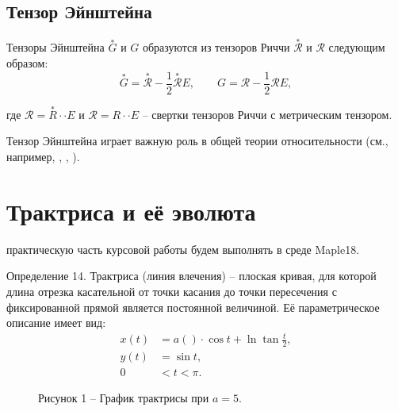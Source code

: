 \documentclass[14pt,a4paper]{extarticle}
\begin{document}
\subsection{Тензор Эйнштейна}
Тензоры Эйнштейна $\overset{*}{G}$ и $G$ образуются из тензоров Риччи $\overset{*}{\mathcal{R}}$ и $\mathcal{R}$ следующим образом:
\begin{equation}\label{eq39}
	\overset{*}{G} = \overset{*}{\mathcal{R}} - \frac{1}{2}\overset{*}{\mathcal{R}}E, \qquad G = \mathcal{R} - \frac{1}{2}\mathcal{R}E,
\end{equation}

где $\mathcal{R} = \overset{*}{R} \cdot \cdot E$ и $\mathcal{R} = R \cdot \cdot E$ -- свертки тензоров Риччи с метрическим тензором.

Тензор Эйнштейна играет важную роль в общей теории относительности (см., например, \cite{Petrov}, \cite{Rashevskiy}, \cite{Shipov}).



\newpage
\section{Трактриса и её эволюта}
практическую часть курсовой работы будем выполнять в среде Maple18.


Определение 14. Трактриса (линия влечения) -- плоская кривая, для которой длина отрезка касательной от точки касания до точки пересечения с фиксированной прямой является постоянной величиной. Её параметрическое описание имеет вид:
\begin{align}
	x(t) &= a ()\cdot \cos{t} + \ln{\tan{\frac{t}{2}}},\label{eq40}\\
	y(t) &= \sin{t},\label{eq41}\\
	0 &< t < \pi.\label{eq42}
\end{align}

\begin{figure}[h]
	\caption*{Рисунок 1 -- График трактрисы при $a=5$.}
	\label{ris:plot1}
\end{figure}
\end{document}
